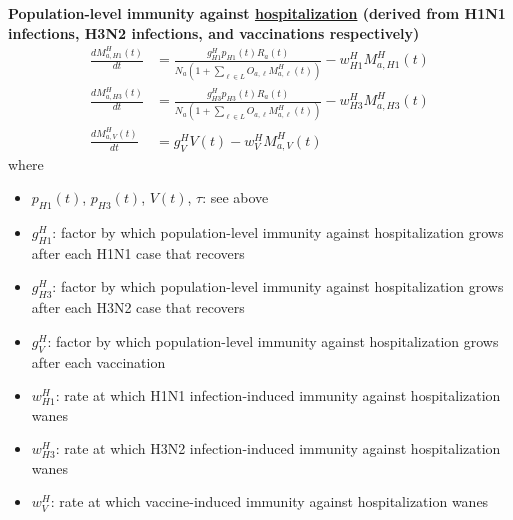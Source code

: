\documentclass[11pt]{article}
\begin{document}
\textbf{Population-level immunity against \underline{hospitalization} (derived from H1N1 infections, H3N2 infections, and vaccinations respectively)}
\begin{align}
    \frac{dM^H_{a,H1}(t)}{dt} &= \frac{g^H_{H1} p_{H1}(t) R_a(t)}{N_a \left(1 + \sum_{\ell \in L} O_{a, \ell} M^H_{a, \ell}(t)\right)} - w^H_{H1} M^H_{a, H1}(t) \\
    \frac{dM^H_{a,H3}(t)}{dt} &= \frac{g^H_{H3} p_{H3}(t) R_a(t)}{N_a \left(1 + \sum_{\ell \in L} O_{a, \ell} M^H_{a, \ell}(t)\right)} - w^H_{H3} M^H_{a, H3}(t) \\
    \frac{dM^H_{a,V}(t)}{dt} &= g^H_V V(t) - w^H_V M^H_{a, V}(t)
\end{align}
where
\begin{itemize}
    \item $p_{H1}(t)$, $p_{H3}(t)$, $V(t)$, $\tau$: see above
    \item $g^H_{H1}$: factor by which population-level immunity against hospitalization grows after each H1N1 case that recovers
    \item $g^H_{H3}$: factor by which population-level immunity against hospitalization grows after each H3N2 case that recovers
    \item $g^H_V$: factor by which population-level immunity against hospitalization grows after each vaccination
    \item $w^H_{H1}$: rate at which H1N1 infection-induced immunity against hospitalization wanes
    \item $w^H_{H3}$: rate at which H3N2 infection-induced immunity against hospitalization wanes
    \item $w^H_V$: rate at which vaccine-induced immunity against hospitalization wanes
    \newline
\end{itemize}
\end{document}

